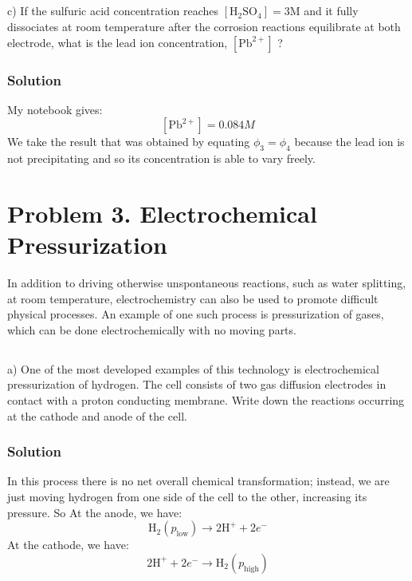 \documentclass[12pt]{article}
\begin{document}
\subsection{}
c) If the sulfuric acid concentration reaches $\left[\mathrm{H}_{2} \mathrm{SO}_{4}\right]=3 \mathrm{M}$ and it fully dissociates at room temperature after the corrosion reactions equilibrate at both electrode, what is the lead ion concentration, $\left[\mathrm{Pb}^{2+}\right]$ ?
\subsubsection{Solution}
My notebook gives:
\begin{equation}
    \left[\mathrm{Pb}^{2+}\right] = 0.084 M
\end{equation}
We take the result that was obtained by equating $\phi_3 = \phi_4$ because the lead ion is not precipitating and so its concentration is able to vary freely.
\section{Problem 3. Electrochemical Pressurization}
In addition to driving otherwise unspontaneous reactions, such as water splitting, at room temperature, electrochemistry can also be used to promote difficult physical processes. An example of one such process is pressurization of gases, which can be done electrochemically with no moving parts.\\
\subsection{}
a) One of the most developed examples of this technology is electrochemical pressurization of hydrogen. The cell consists of two gas diffusion electrodes in contact with a proton conducting membrane. Write down the reactions occurring at the cathode and anode of the cell.\\
\subsubsection{Solution}
In this process there is no net overall chemical transformation; instead, we are just moving hydrogen from one side of the cell to the other, increasing its pressure. So
At the anode, we have:
\begin{equation}
    \mathrm{H}_{2}(p_\text{low}) \rightarrow 2 \mathrm{H}^{+} + 2 e^{-}
\end{equation}
At the cathode, we have:
\begin{equation}
    2 \mathrm{H}^{+} + 2 e^{-} \rightarrow \mathrm{H}_{2}(p_\text{high})
\end{equation}
\end{document}
